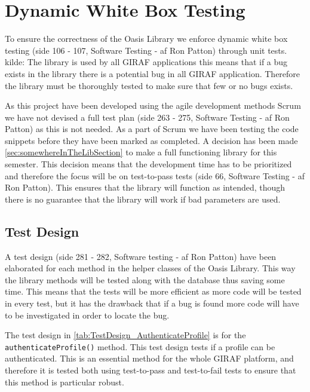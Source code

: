 \section{Dynamic White Box Testing}
\label{sec:DynamicWhiteBoxTesting}
To ensure the correctness of the Oasis Library we enforce dynamic white box testing (side 106 - 107, Software Testing - af Ron Patton) through unit tests. 
kilde: %
The library is used by all GIRAF applications this means that if a bug exists in the library there is a potential bug in all GIRAF application.
Therefore the library must be thoroughly tested to make sure that few or no bugs exists.

As this project have been developed using the agile development methods Scrum we have not devised a full test plan (side 263 - 275, Software Testing - af Ron Patton) as this is not needed.
As a part of Scrum we have been testing the code snippets before they have been marked as completed.
A decision has been made \autoref{sec:somewhereInTheLibSection} to make a full functioning library for this semester.
This decision means that the development time has to be prioritized and therefore the focus will be on test-to-pass tests (side 66, Software Testing - af Ron Patton).
This ensures that the library will function as intended, though there is no guarantee that the library will work if bad parameters are used.

\subsection{Test Design}
A test design (side 281 - 282, Software testing - af Ron Patton) have been elaborated for each method in the helper classes of the Oasis Library.
This way the library methods will be tested along with the database thus saving some time.
This means that the tests will be more efficient as more code will be tested in every test, but it has the drawback that if a bug is found more code will have to be investigated in order to locate the bug.

The test design in \autoref{tab:TestDesign_AuthenticateProfile} is for the \texttt{authenticateProfile()} method.
This test design tests if a profile can be authenticated.
This is an essential method for the whole GIRAF platform, and therefore it is tested both using test-to-pass and test-to-fail tests to ensure that this method is particular robust.

